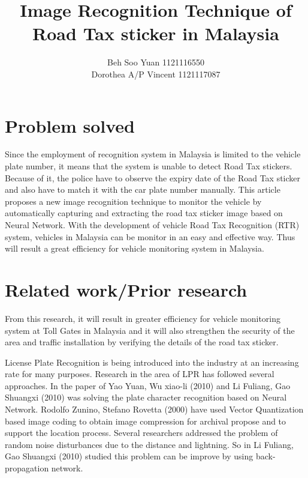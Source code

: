 \documentclass[12pt]{article}
\title{Image Recognition Technique of Road Tax sticker in Malaysia}
\author{Beh Soo Yuan 1121116550\\Dorothea A/P Vincent 1121117087}
\begin{document}
\maketitle
{}

\section{Problem solved}
Since the employment of recognition system in Malaysia is limited to the vehicle plate number, it means that the system is unable to detect Road Tax stickers. Because of it, the police have to observe the expiry date of the Road Tax sticker and also have to match it with the car plate number manually. This article proposes a new image recognition technique to monitor the vehicle by automatically capturing and extracting the road tax sticker image based on Neural Network. With the development of vehicle Road Tax Recognition (RTR) system, vehicles in Malaysia can be monitor in an easy and effective way. Thus will result a great efficiency for vehicle monitoring system in Malaysia.\cite{6516388}

\section{Related work/Prior research}
From this research, it will result in greater efficiency for vehicle monitoring system at Toll Gates in Malaysia and it will also strengthen the security of the area and traffic installation by verifying the details of the road tax sticker.

License Plate Recognition is being introduced into the industry at an increasing rate for many purposes. Research in the area of LPR has followed several approaches. In the paper of Yao Yuan, Wu xiao-li (2010) and Li Fuliang, Gao Shuangxi (2010) was solving the plate character recognition based on Neural Network.\cite{bpnn}\cite{digitalImg} Rodolfo Zunino, Stefano Rovetta (2000) have used Vector Quantization based image coding to obtain image compression for archival propose and to support the location process.\cite{vq} Several researchers addressed the problem of random noise disturbances due to the distance and lightning. So in Li Fuliang, Gao Shuangxi (2010) studied this problem can be improve by using back- propagation network. 
\end{document}
